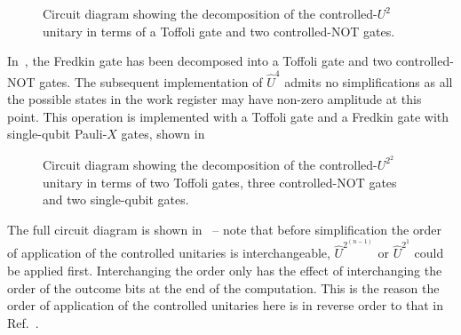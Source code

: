 \clearpage

\begin{figure}[h]
	\centering
	\caption[Circuit diagram showing the decomposition of the controlled-$U^{2^1}$ unitary]{Circuit diagram showing the decomposition of the controlled-$U^{2}$ unitary in terms of a Toffoli gate and two controlled-NOT gates.}
\end{figure}

\noindent
In~, the Fredkin gate has been decomposed into a Toffoli gate and two controlled-NOT gates. The subsequent implementation of $\hat{U}^{4}$ admits no simplifications as all the possible states in the work register may have non-zero amplitude at this point. This operation is implemented with a Toffoli gate and a Fredkin gate with single-qubit Pauli-$X$ gates, shown in~

\begin{figure}[h]
	\centering
	\caption[Circuit diagram showing the decomposition of the controlled-$U^{2^2}$ unitary ]{Circuit diagram showing the decomposition of the controlled-$U^{2^2}$ unitary in terms of two Toffoli gates, three controlled-NOT gates and two single-qubit gates.}
\end{figure}

\noindent
The full circuit diagram is shown in~ -- note that before simplification the order of application of the controlled unitaries is interchangeable, $\hat{U}^{2^{(n-1)}}$ or $\hat{U}^{2^{1}}$ could be applied first. Interchanging the order only has the effect of interchanging the order of the outcome bits at the end of the computation. This is the reason the order of application of the controlled unitaries here is in reverse order to that in Ref.~\cite{Lopez_2012}.

